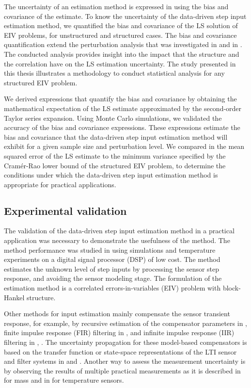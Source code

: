 The uncertainty of an estimation method is expressed in \citet{Pintelon12Book} using the bias and covariance of the estimate.
To know the uncertainty of the data-driven step input estimation method, we quantified the bias and covariance of the LS solution of EIV problems, for unstructured and structured cases. 
The bias and covariance quantification extend the perturbation analysis that was investigated in \citet{Stewart90SPT} and in \citet{Vaccaro94}.
The conducted analysis provides insight into the impact that the structure and the correlation have on the LS estimation uncertainty.
The study presented in this thesis illustrates a methodology to conduct statistical analysis for any structured EIV problem.

We derived expressions that quantify the bias and covariance by obtaining the mathematical expectation of the LS estimate approximated by the second-order Taylor series expansion.
Using Monte Carlo simulations, we validated the accuracy of the bias and covariance expressions.
These expressions estimate the bias and covariance that the data-driven step input estimation method will exhibit for a given sample size and perturbation level.
We compared in \citet{QuintanaCSDA} the mean squared error of the LS estimate to the minimum variance specified by the Cram\'er-Rao lower bound of the structured EIV problem, to determine the conditions under which the data-driven step input estimation method is appropriate for practical applications.


\subsection{Experimental validation}

The validation of the data-driven step input estimation method in a practical application was necessary to demonstrate the usefulness of the method.
The method performance was studied in \citet{Markovsky15cep} using simulations and temperature experiments on a digital signal processor (DSP) of low cost.
The method estimates the unknown level of step inputs by processing the sensor step response, and 
avoiding the sensor modeling stage.
The formulation of the estimation method is a correlated errors-in-variables (EIV) problem with block-Hankel structure.

Other methods for input estimation mainly compensate the sensor transient response, for example, by 
recursive estimation of the compensator parameters in \citet{Shu93}, 
finite impulse response (FIR) filtering in \citet{Elster07}, \citet{Niedzwiecki16b} and 
infinite impulse response (IIR) filtering in \citet{Pintelon90}, \citet{Elster08}.
The uncertainty propagation for these model-based compensators is based on the transfer function or state-space representations of the LTI sensor and filter systems in \citet{Link09} and \citet{Hale09}.
Another way to assess the measurement uncertainty is by observing the results of multiple practical measurements as it is described in \citet{Pietrzak14} for mass and in \citet{Ogorevc16} for temperature sensors.

